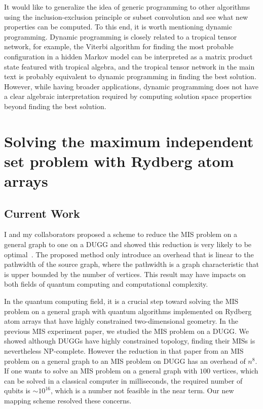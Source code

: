 \documentclass[a4paper]{article}
\newcommand{\<}{\langle}
\renewcommand{\>}{\rangle}
\begin{document}
It would like to generalize the idea of generic programming to other algorithms using the inclusion-exclusion principle or subset convolution and see what new properties can be computed.
To this end, it is worth mentioning dynamic programming.
Dynamic programming is closely related to a tropical tensor network, for example, the Viterbi algorithm for finding the most probable configuration in a hidden Markov model can be interpreted as a matrix product state featured with tropical algebra, and the tropical tensor network in the main text is probably equivalent to dynamic programming in finding the best solution.
However, while having broader applications,
dynamic programming does not have a clear algebraic interpretation required by computing solution space properties beyond finding the best solution.

\section{Solving the maximum independent set problem with Rydberg atom arrays}
\subsection{Current Work}
I and my collaborators proposed a scheme to reduce the MIS problem on a general graph to one on a DUGG and showed this reduction is very likely to be optimal~\cite{Liu2022b}.
The proposed method only introduce an overhead that is linear to the pathwidth of the source graph, where the pathwidth is a graph characteristic that is upper bounded by the number of vertices.
This result may have impacts on both fields of quantum computing and computational complexity.

In the quantum computing field, it is a crucial step toward solving the MIS problem on a general graph with quantum algorithms implemented on Rydberg atom arrays that have highly constrained two-dimensional geometry.
In the previous MIS experiment paper, we studied the MIS problem on a DUGG. We showed although DUGGs have highly constrained topology, finding their MISs is nevertheless NP-complete.
However the reduction in that paper from an MIS problem on a general graph to an MIS problem on DUGG has an overhead of $n^8$.
If one wants to solve an MIS problem on a general graph with $100$ vertices, which can be solved in a classical computer in milliseconds, the required number of qubits is $\sim10^{16}$, which is a number not feasible in the near term.
Our new mapping scheme resolved these concerns.
\end{document}
